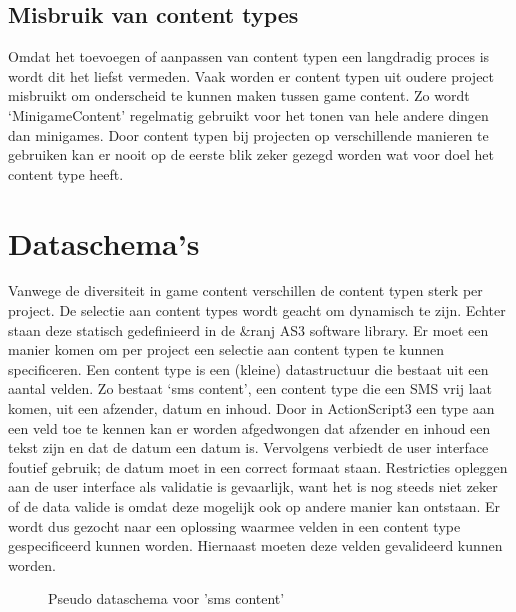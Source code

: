 \subsection{Misbruik van content types}
Omdat het toevoegen of aanpassen van content typen een langdradig proces is wordt dit het liefst vermeden. Vaak worden er content typen uit oudere project misbruikt om onderscheid te kunnen maken tussen game content. Zo wordt ‘MinigameContent’ regelmatig gebruikt voor het tonen van hele andere dingen dan minigames.
Door content typen bij projecten op verschillende manieren te gebruiken kan er nooit op de eerste blik zeker gezegd worden wat voor doel het content type heeft.

\section{Dataschema’s}
Vanwege de diversiteit in game content verschillen de content typen sterk per project. De selectie aan content types wordt geacht om dynamisch te zijn. Echter staan deze statisch gedefinieerd in de \&ranj AS3 software library. Er moet een manier komen om per project een selectie aan content typen te kunnen specificeren.
Een content type is een (kleine) datastructuur die bestaat uit een aantal velden. Zo bestaat ‘sms content’, een content type die een SMS vrij laat komen, uit een afzender, datum en inhoud. Door in ActionScript3 een type aan een veld toe te kennen kan er worden afgedwongen dat afzender en inhoud een tekst zijn en dat de datum een datum is. Vervolgens verbiedt de user interface foutief gebruik; de datum moet in een correct formaat staan. Restricties opleggen aan de user interface als validatie is gevaarlijk, want het is nog steeds niet zeker of de data valide is omdat deze mogelijk ook op andere manier kan ontstaan. Er wordt dus gezocht naar een oplossing waarmee velden in een content type gespecificeerd kunnen worden. Hiernaast moeten deze velden gevalideerd kunnen worden.

\begin{wrapfigure}{r}{0.5\textwidth}
    \caption{Pseudo dataschema voor 'sms content'}
    \label{fig:pseudosmscontent}
\end{wrapfigure}

